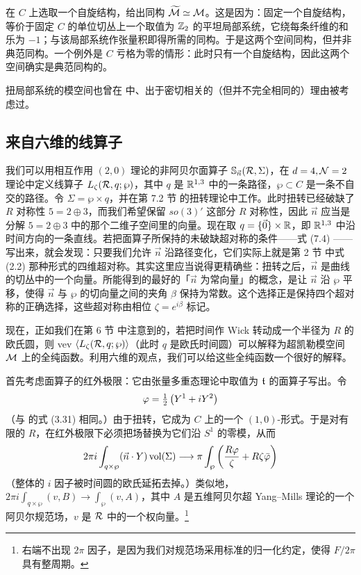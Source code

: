 在 $C$ 上选取一个自旋结构，给出同构 $\widetilde{\cal M}\simeq\mathcal{M}$。这是因为：固定一个自旋结构，等价于固定 $C$ 的单位切丛上一个取值为 $\mathbb{Z}_2$ 的平坦局部系统，它绕每条纤维的和乐为 $-1$；与该局部系统作张量积即得所需的同构。于是这两个空间同构，但并非典范同构。一个例外是 $C$ 亏格为零的情形：此时只有一个自旋结构，因此这两个空间确实是典范同构的。

扭局部系统的模空间也曾在 \cite{MR2233852,Frenkel:2007tx} 中、出于密切相关的（但并不完全相同的）理由被考虑过。

\subsection{来自六维的线算子}

我们可以用相互作用 $(2,0)$ 理论的非阿贝尔面算子 ${\mathbb S}_{\vec n}(\mathcal{R},\Sigma)$，在 $d=4,\mathcal{N}=2$ 理论中定义线算子 $L_\zeta(\mathcal{R},q;\wp)$，其中 $q$ 是 $\mathbb{R}^{1,3}$ 中的一条路径，$\wp\subset C$ 是一条不自交的路径。令 $\Sigma=\wp\times q$，并在第 7.2 节%
的扭转理论中工作。此时扭转已经破缺了 $R$ 对称性 $5=2\oplus3$，而我们希望保留 $so(3)'$ 这部分 $R$ 对称性，因此 $\vec n$ 应当是分解 $5=2\oplus3$ 中的那个二维子空间里的向量。现在取 $q=\{\vec 0\}\times\mathbb{R}$，即 $\mathbb{R}^{1,3}$ 中沿时间方向的一条直线。若把面算子所保持的未破缺超对称的条件——式 (7.4)%
——写出来，就会发现：只要我们允许 $\vec n$ 沿路径变化，它们实际上就是第 2 节%
中式 (2.2)%
那种形式的四维超对称。其实这里应当说得更精确些：扭转之后，$\vec n$ 是曲线的切丛中的一个向量。所能得到的最好的「$\vec n$ 为常向量」的概念，是让 $\vec n$ 沿 $\wp$ 平移，使得 $\vec n$ 与 $\wp$ 的切向量之间的夹角 $\beta$ 保持为常数。这个选择正是保持四个超对称的正确选择，这些超对称由相位 $\zeta=e^{i\beta}$ 标记。

现在，正如我们在第 6 节%
中注意到的，若把时间作 Wick 转动成一个半径为 $R$ 的欧氏圆，则 vev $\langle L_\zeta(\mathcal{R},q;\wp)\rangle$（此时 $q$ 是欧氏时间圆）可以解释为超凯勒模空间 $\mathcal{M}$ 上的全纯函数。利用六维的观点，我们可以给这些全纯函数一个很好的解释。

首先考虑面算子的红外极限：它由张量多重态理论中取值为 $\mathfrak{t}$ 的面算子写出。令
\begin{equation}\label{eq:varph-Y}
\varphi = \tfrac{1}{2}\left( Y^1 + i Y^2 \right)
\end{equation}
（与 \cite{Gaiotto:2009hg} 的式 (3.31) 相同。）由于扭转，它成为 $C$ 上的一个 $(1,0)$-形式。于是对有限的 $R$，在红外极限下必须把场替换为它们沿 $S^1$ 的零模，从而
\begin{equation}
2\pi i \int_{q\times \wp} (\vec n\cdot Y) \operatorname{vol}(\Sigma) \longrightarrow \pi \int_\wp \left( \frac{R \varphi}{\zeta} + R \zeta \bar \varphi \right)
\end{equation}
（整体的 $i$ 因子被时间圆的欧氏延拓去掉。）类似地，$2\pi i\int_{q\times\wp}(v,B)\longrightarrow \int_\wp(v,A)$，其中 $A$ 是五维阿贝尔超 Yang--Mills 理论的一个阿贝尔规范场，$v$ 是 $\mathcal{R}$ 中的一个权向量。\footnote{右端不出现 $2\pi$ 因子，是因为我们对规范场采用标准的归一化约定，使得 $F/2\pi$ 具有整周期。}

